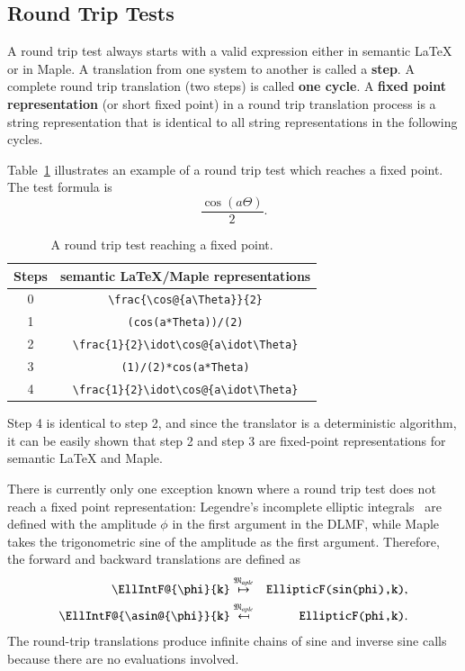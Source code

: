 \documentclass[a4paper,11pt]{article}
\newcommand{\DLMF}{DLMF}
\newcommand{\Maple}{Maple}
\newcommand{\langMaple}{\mathfrak{M}_{aple}}
\theoremstyle{defTheoStyle}
\theoremstyle{defExampStyle}
\begin{document}
\subsection{Round Trip Tests}\label{sec:round-trip}
A round trip test always starts with a valid expression either in semantic \LaTeX{} or in \Maple. A translation from one system to another is called a \textbf{step}. A complete round trip translation (two steps) is called \textbf{one cycle}. A \textbf{fixed point representation} (or short fixed point) in a round trip translation process is a string representation that is identical to all string representations in the following cycles.

Table~\ref{tab:fixpoint} illustrates an example of a round trip test which reaches a fixed point. The test formula is
\begin{equation}
\frac{\cos\left(a\Theta\right)}{2}.
\end{equation}

\begin{table}[ht]
\centering
\begin{tabular}{cc}
	\hline 
	Steps & semantic \LaTeX{}/\Maple{} representations\\
	\hline
	\rule{0pt}{0.9\normalbaselineskip}0 & \verb|\frac{\cos@{a\Theta}}{2}|\\
	1 & \verb|(cos(a*Theta))/(2)| \\
	2 & \verb|\frac{1}{2}\idot\cos@{a\idot\Theta}| \\
	3 & \verb|(1)/(2)*cos(a*Theta)|\\
	4 & \verb|\frac{1}{2}\idot\cos@{a\idot\Theta}| \\
	\hline
\end{tabular}
\caption{A round trip test reaching a fixed point.}
\label{tab:fixpoint}
\end{table}

Step 4 is identical to step 2, and since the translator is a deterministic algorithm, it can be easily shown that step 2 and step 3 are fixed-point representations for semantic \LaTeX{} and \Maple.

There is currently only one exception known where a round trip test does not reach a fixed point representation: Legendre's incomplete elliptic integrals~\parencite[(19.2.4-7)]{NIST:DLMF} are defined with the amplitude $\phi$ in the first argument in the \DLMF, while \Maple{} takes the trigonometric sine of the amplitude as the first argument. Therefore, the forward and backward translations are defined as
\begin{eqnarray}
\verb|\EllIntF@{\phi}{k}| & \overset{\langMaple}{\mapsto} & \verb|EllipticF(sin(phi),k)|,\\
\verb|\EllIntF@{\asin@{\phi}}{k}| & \overset{\langMaple}{\mapsfrom} & \verb|EllipticF(phi,k)|.
\end{eqnarray}
The round-trip translations produce infinite chains of sine and inverse sine calls because there are no evaluations involved. 
\end{document}
